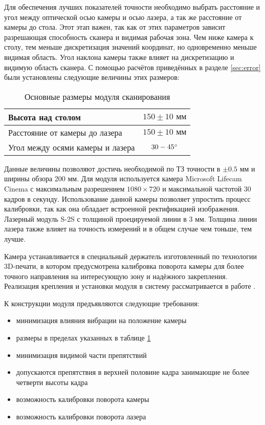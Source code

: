         Для обеспечения лучших показателей точности необходимо выбрать расстояние и угол между оптической осью камеры и осью лазера, а так же расстояние от камеры до стола. Этот этап важен, так как от этих параметров зависит разрешающая способность сканера и видимая рабочая зона. Чем ниже камера к столу, тем меньше дискретизация значений координат, но одновременно меньше видимая область. Угол наклона камеры также влияет на дискретизацию и видимую область сканера.
        С помощью расчётов  приведённых в разделе \ref{sec:error} были установлены следующие величины этих размеров:
        \begin{table}[H]
            \centering
            \caption{Основные размеры модуля сканирования}\label{table:dims}
            \begin{tabular}{|l|c|} \hline
                Высота над столом& $ 150  \pm 10 \text{ мм} $\\ \hline
                Расстояние от камеры до лазера& $ 150  \pm 10 \text{ мм} $\\ \hline
                Угол между осями камеры и лазера& $ 30-45^{\circ} $\\ \hline
            \end{tabular}
        \end{table}
        Данные величины позволяют достичь необходимой по ТЗ точности в $ \pm 0.5 \text{ мм} $ и ширины обзора 200 мм.
        Для модуля используется камера Microsoft Lifecam Cinema с максимальным разрешением $ 1080 
        \times 720 $ и максимальной частотой 30 кадров в секунду. Использование данной камеры позволяет упростить процесс калибровки, так как она обладает встроенной ректификацией изображения. Лазерный модуль S-2S с толщиной проецируемой линии в 3 мм. Толщина линии лазера также влияет на точность измерений и в общем случае чем тоньше, тем лучше.

        Камера устанавливается в специальный держатель изготовленный по технологии 3D-печати, в котором предусмотрена калибровка поворота камеры для более точного направления на интересующую зону и надёжного закрепления. Реализация крепления и установки модуля в систему рассматривается в работе . 

        К конструкции модуля предъявляются следующие требования:
        \begin{itemize}
            \item минимизация влияния вибрации на положение камеры
            \item размеры в пределах указанных в таблице \ref{table:dims}
            \item минимизация видимой части препятствий
            \item допускаются препятствия в верхней половине кадра занимающие не более четверти высоты кадра
            \item возможность калибровки поворота камеры
            \item возможность калибровки поворота лазера
        \end{itemize}
    
